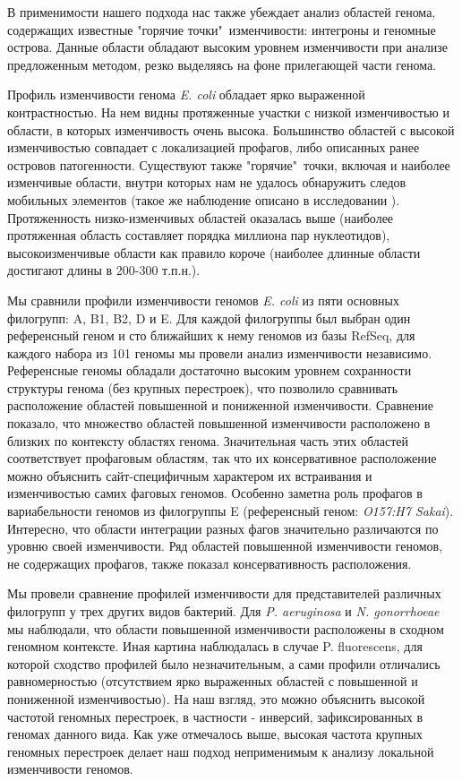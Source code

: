 В применимости нашего подхода нас также убеждает анализ областей генома, содержащих известные "горячие точки"\ изменчивости: интегроны и геномные острова. Данные области обладают высоким уровнем изменчивости при анализе предложенным методом, резко выделяясь на фоне прилегающей части генома. 

Профиль изменчивости генома \textit{E. coli} обладает ярко выраженной контрастностью. На нем видны протяженные участки с низкой изменчивостью и области, в которых изменчивость очень высока. Большинство областей с высокой изменчивостью совпадает с локализацией профагов, либо описанных ранее островов патогенности. Существуют также "горячие"\ точки, включая и наиболее изменчивые области, внутри которых нам не удалось обнаружить следов мобильных элементов (такое же наблюдение описано в исследовании \cite{oliveira2017chromosomal}). Протяженность низко-изменчивых областей оказалась выше (наиболее протяженная область составляет порядка миллиона пар нуклеотидов), высокоизменчивые области как правило короче (наиболее длинные области достигают длины в 200-300 т.п.н.).

Мы сравнили профили изменчивости геномов \textit{E. coli} из пяти основных филогрупп: A, B1, B2, D и E. Для каждой филогруппы был выбран один референсный геном и сто ближайших к нему геномов из базы RefSeq, для каждого набора из 101 геномы мы провели анализ изменчивости независимо. Референсные геномы обладали достаточно высоким уровнем сохранности структуры генома (без крупных перестроек), что позволило сравнивать расположение областей повышенной и пониженной изменчивости. Сравнение показало, что множество областей повышенной изменчивости расположено в близких по контексту областях генома. Значительная часть этих областей соответствует профаговым областям, так что их консервативное расположение можно объяснить сайт-специфичным характером их встраивания и изменчивостью самих фаговых геномов. Особенно заметна роль профагов в вариабельности геномов из филогруппы E (референсный геном: \textit{O157:H7 Sakai}). Интересно, что области интеграции разных фагов значительно различаются по уровню своей изменчивости. Ряд областей повышенной изменчивости геномов, не содержащих профагов, также показал консервативность расположения.

Мы провели сравнение профилей изменчивости для представителей различных филогрупп у трех других видов бактерий. Для \textit{P. aeruginosa} и \textit{N. gonorrhoeae} мы наблюдали, что области повышенной изменчивости расположены в сходном геномном контексте. Иная картина наблюдалась в случае {P. fluorescens}, для которой сходство профилей было незначительным, а сами профили отличались равномерностью (отсутствием ярко выраженных областей с повышенной и пониженной изменчивостью). На наш взгляд, это можно объяснить высокой частотой геномных перестроек, в частности - инверсий, зафиксированных в геномах данного вида. Как уже отмечалось выше, высокая частота крупных геномных перестроек делает наш подход неприменимым к анализу локальной изменчивости геномов. 

